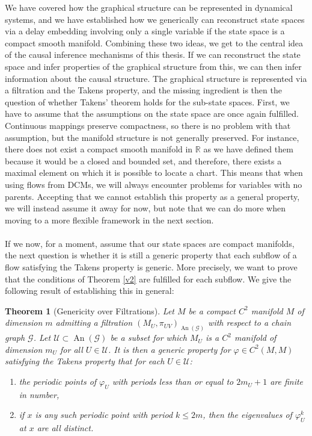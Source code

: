 \documentclass[11pt, a4paper]{memoir}
\theoremstyle{break}
\newtheorem{thm}{Theorem}
\theoremstyle{break}
\theoremstyle{nonumberplain}
\newcommand{\mR}{\mathbb{R}}
\DeclareMathOperator{\an}{An}
\begin{document}
We have covered how the graphical structure can be represented in dynamical systems, and we have established how we generically can reconstruct state spaces via a delay embedding involving only a single variable if the state space is a compact smooth manifold. Combining these two ideas, we get to the central idea of the causal inference mechanisms of this thesis. If we can reconstruct the state space and infer properties of the graphical structure from this, we can then infer information about the causal structure. The graphical structure is represented via a filtration and the Takens property, and the missing ingredient is then the question of whether Takens' theorem holds for the sub-state spaces. First, we have to assume that the assumptions on the state space are once again fulfilled. Continuous mappings preserve compactness, so there is no problem with that assumption, but the manifold structure is not generally preserved. For instance, there does not exist a compact smooth manifold in $\mR$ as we have defined them because it would be a closed and bounded set, and therefore, there exists a maximal element on which it is possible to locate a chart. This means that when using flows from DCMs, we will always encounter problems for variables with no parents. Accepting that we cannot establish this property as a general property, we will instead assume it away for now, but note that we can do more when moving to a more flexible framework in the next section.\\\\
If we now, for a moment, assume that our state spaces are compact manifolds, the next question is whether it is still a generic property that each subflow of a flow satisfying the Takens property is generic. More precisely, we want to prove that the conditions of Theorem \ref{v2} are fulfilled for each subflow. We give the following result of \cite{mathFound} establishing this in general:
\begin{thm}[Genericity over Filtrations]\label{tech}
Let $M$ be a compact $C^2$ manifold $M$ of dimension $m$ admitting a filtration $(M_U,\pi_{UV})_{\an(\mathcal{G})}$ with respect to a chain graph $\mathcal{G}$. Let $\mathcal{U}\subset \an(\mathcal{G})$ be a subset for which $M_U$ is a $C^2$ manifold of dimension $m_U$ for all $U\in \mathcal{U}$. It is then a generic property for $\varphi\in C^2(M,M)$ satisfying the Takens property that for each $U\in \mathcal{U}$: 
\begin{enumerate}[label=\arabic*)]
	\item the periodic points of $\varphi_U$ with periods less than or equal to $2m_U+1$ are finite in number,
	\item if $x$ is any such periodic point with period $k\leqslant 2m$, then the eigenvalues of $\varphi^k_U$ at $x$ are all distinct.
\end{enumerate}
\end{thm}
\end{document}
